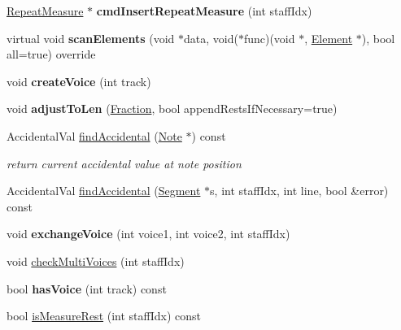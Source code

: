 \begin{DoxyCompactItemize}
\hyperlink{class_ms_1_1_repeat_measure}{Repeat\+Measure} $\ast$ {\bfseries cmd\+Insert\+Repeat\+Measure} (int staff\+Idx)
\item 
\mbox{\label{class_ms_1_1_measure_ad7a49f661029c21fc7a8fdc596b0e7b3}} 
virtual void {\bfseries scan\+Elements} (void $\ast$data, void($\ast$func)(void $\ast$, \hyperlink{class_ms_1_1_element}{Element} $\ast$), bool all=true) override
\item 
\mbox{\label{class_ms_1_1_measure_a87d09ddfc28cac3d0ebb184cfe2788cc}} 
void {\bfseries create\+Voice} (int track)
\item 
\mbox{\label{class_ms_1_1_measure_addc2f2f48a6fe5a8a3a6c2da234474bc}} 
void {\bfseries adjust\+To\+Len} (\hyperlink{class_ms_1_1_fraction}{Fraction}, bool append\+Rests\+If\+Necessary=true)
\item 
\mbox{\label{class_ms_1_1_measure_a4f56e739033bcbc53b8a20f03ad03938}} 
Accidental\+Val \hyperlink{class_ms_1_1_measure_a4f56e739033bcbc53b8a20f03ad03938}{find\+Accidental} (\hyperlink{class_ms_1_1_note}{Note} $\ast$) const
\begin{DoxyCompactList}\small\item\em return current accidental value at note position \end{DoxyCompactList}\item 
Accidental\+Val \hyperlink{class_ms_1_1_measure_a15f7fbbb7f21f0c936bb2e55c502c499}{find\+Accidental} (\hyperlink{class_ms_1_1_segment}{Segment} $\ast$s, int staff\+Idx, int line, bool \&error) const
\item 
\mbox{\label{class_ms_1_1_measure_ab319c55877dbe3260530eebb9ae006c4}} 
void {\bfseries exchange\+Voice} (int voice1, int voice2, int staff\+Idx)
\item 
void \hyperlink{class_ms_1_1_measure_aef2c1170f14dd5ba1a773c2d7e28d067}{check\+Multi\+Voices} (int staff\+Idx)
\item 
\mbox{\label{class_ms_1_1_measure_a0f8588760bcec4b2be52c042b26fec86}} 
bool {\bfseries has\+Voice} (int track) const
\item 
bool \hyperlink{class_ms_1_1_measure_aeeafec0568970fc37381787f03ea35cd}{is\+Measure\+Rest} (int staff\+Idx) const

\end{DoxyCompactItemize}
